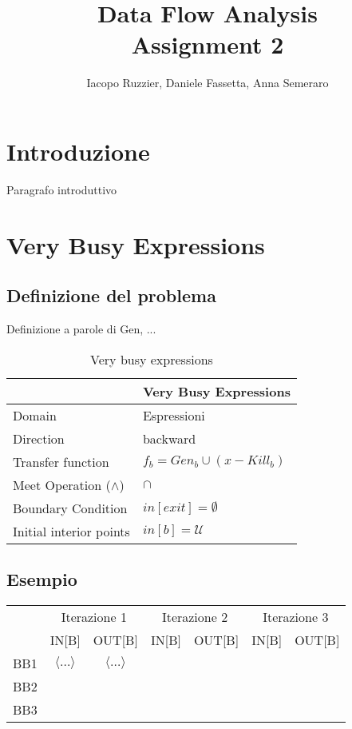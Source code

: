 \documentclass[10pt,a4paper]{article}
\begin{document}
\title{Data Flow Analysis \\
\large Assignment 2}
\author{Iacopo Ruzzier, Daniele Fassetta, Anna Semeraro}

\maketitle
\tableofcontents

\newpage

\section{Introduzione}

Paragrafo introduttivo

\section{Very Busy Expressions}
\subsection{Definizione del problema}

Definizione a parole di Gen, ...


\begin{table}[h!]
  \centering
  \begin{tabular}{|l|p{4cm}|}
    \hline
    \textbf{} & \textbf{Very Busy Expressions} \\
    \hline
    Domain & Espressioni\\
    \hline
    Direction & backward\\
    \hline
    Transfer function & $f_b = Gen_b \cup (x - Kill_b) $\\
    \hline
    Meet Operation ($\land$) & $\cap$ \\
    \hline
    Boundary Condition & $in[exit] = \emptyset$ \\
    \hline
    Initial interior points & $in[b] = \mathcal{U}$ \\
    \hline
  \end{tabular}
  \caption{Very busy expressions}
\end{table}

\subsection{Esempio}
\begin{table}[h!]
\centering
\renewcommand{\arraystretch}{1.5}
\begin{tabular}{|c|c|c|c|c|c|c|}
\hline
\rowcolor{blue!30}
 & \multicolumn{2}{c|}{Iterazione 1} & \multicolumn{2}{c|}{Iterazione 2} & \multicolumn{2}{c|}{Iterazione 3} \\
\rowcolor{blue!30}
 & IN[B] & OUT[B] & IN[B] & OUT[B] & IN[B] & OUT[B] \\
\hline
BB1 & $\langle \ldots \rangle$ & $\langle \ldots \rangle$ & & & & \\
\hline
BB2 & & & & & & \\
\hline
BB3 & & & & & & \\
\hline
\end{tabular}
\end{table}
\end{document}
